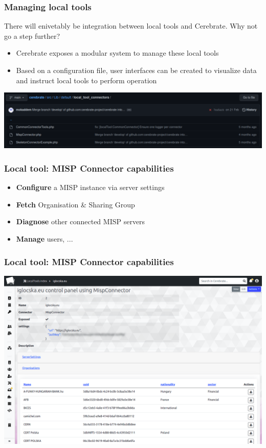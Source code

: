 \begin{frame}
\frametitle{Managing local tools}
There will enivetably be integration between local tools and Cerebrate. Why not go a step further?
    \begin{itemize}
        \item Cerebrate exposes a modular system to manage these local tools
        \item Based on a configuration file, user interfaces can be created to visualize data and instruct local tools to perform operation
    \end{itemize}
    \begin{center}
        \includegraphics[width=0.7\linewidth]{pictures/github-local-tool.png}
    \end{center}
\end{frame}

\begin{frame}
\frametitle{Local tool: MISP Connector capabilities}
    \begin{itemize}
        \item \textbf{Configure} a MISP instance via server settings
        \item \textbf{Fetch} Organisation \& Sharing Group
        \item \textbf{Diagnose} other connected MISP servers
        \item \textbf{Manage} users, ...
    \end{itemize}
\end{frame}

\begin{frame}
\frametitle{Local tool: MISP Connector capabilities}
    \begin{center}
        \includegraphics[width=0.97\linewidth]{pictures/localtool-view.png}
    \end{center}
\end{frame}

